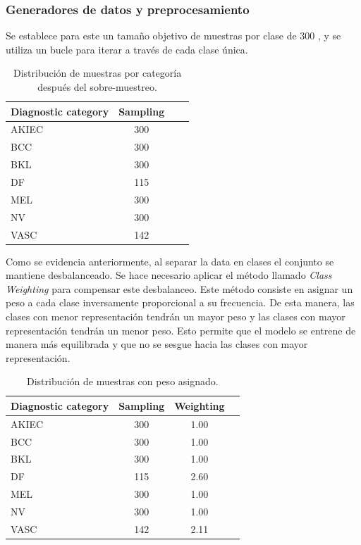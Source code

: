\subsubsection*{Generadores de datos y preprocesamiento}

Se establece para este un tamaño objetivo de muestras por clase de $300$ , y se utiliza un bucle para iterar a través de cada clase única.

\begin{table}[H]
   \centering
   \begin{tabular}{lccc}
   \hline
   Diagnostic category & Sampling  \\ \hline
   AKIEC & 300 \\
   BCC & 300 \\
   BKL & 300 \\
   DF & 115 \\
   MEL & 300 \\
   NV & 300 \\
   VASC & 142 \\ \hline
   \end{tabular}
   \caption{Distribución de muestras por categoría después del sobre-muestreo.}
   \label{tab:sampling_distribution_1}
   \end{table}


Como se evidencia anteriormente, al separar la data en clases el conjunto se mantiene desbalanceado. Se hace necesario aplicar el método llamado \textit{Class Weighting} para compensar este desbalanceo. Este método consiste en asignar un peso a cada clase inversamente proporcional a su frecuencia. De esta manera, las clases con menor representación tendrán un mayor peso y las clases con mayor representación tendrán un menor peso. Esto permite que el modelo se entrene de manera más equilibrada y que no se sesgue hacia las clases con mayor representación.

\begin{table}[H]
   \centering
   \begin{tabular}{lccc}
   \hline
   Diagnostic category & Sampling  & Weighting\\ \hline
   AKIEC & 300 & 1.00\\
   BCC & 300 & 1.00\\
   BKL & 300 & 1.00\\
   DF & 115 & 2.60\\
   MEL & 300 & 1.00\\
   NV & 300 & 1.00\\
   VASC & 142 & 2.11\\ \hline
   \end{tabular}
   \caption{Distribución de muestras con peso asignado.}
   \label{tab:weighting_distribution}
   \end{table}


